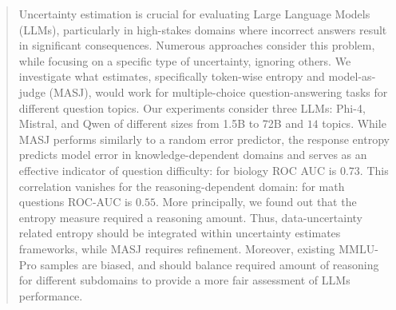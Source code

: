 \begin{abstract}
Uncertainty estimation is crucial for evaluating Large Language Models (LLMs), particularly in high-stakes domains where incorrect answers result in significant consequences.
Numerous approaches consider this problem, while focusing on a specific type of uncertainty, ignoring others.
We investigate what estimates, specifically token-wise entropy and model-as-judge (MASJ), would work for multiple-choice question-answering tasks for different question topics.
Our experiments consider three LLMs: Phi-4, Mistral, and Qwen of different sizes from 1.5B to 72B and $14$ topics.
While MASJ performs similarly to a random error predictor, the response entropy predicts model error in knowledge-dependent domains and serves as an effective indicator of question difficulty: for biology ROC AUC is $0.73$. This correlation vanishes for the reasoning-dependent domain: for math questions ROC-AUC is $0.55$. 
More principally, we found out that the entropy measure required a reasoning amount. Thus, data-uncertainty related entropy should be integrated within uncertainty estimates frameworks, while MASJ requires refinement. 
Moreover, existing MMLU-Pro samples are biased, and should balance required amount of reasoning for different subdomains to provide a more fair assessment of LLMs performance.
\end{abstract}
